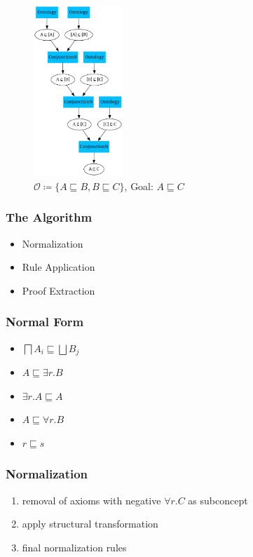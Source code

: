 \documentclass{beamer}
\begin{document}
\begin{frame}
    \frametitle{}
    \begin{figure}
        
        \centering
        \includegraphics[width=0.30\textwidth]{pictures/longerProofExample2_normalized.png}
        \caption{$\mathcal{O} \coloneq \{A \sqsubseteq B , B \sqsubseteq C \}$, Goal: $A \sqsubseteq C$}
    
    \end{figure}
     
 \end{frame}

\begin{frame}
\frametitle{The Algorithm}
\begin{itemize}
    \item Normalization
    \item Rule Application
    \item Proof Extraction
\end{itemize}
\end{frame}

\begin{frame}
\frametitle{Normal Form}
\begin{itemize}
    \item $ \bigsqcap A_i \sqsubseteq \bigsqcup B_j$
    \item $A \sqsubseteq \exists r.B$
    \item $\exists r.A \sqsubseteq A$
    \item $A \sqsubseteq \forall r.B$
    \item $r \sqsubseteq s$
\end{itemize}
  
\end{frame}

\begin{frame}
\frametitle{Normalization}
\begin{enumerate}
    \item removal of axioms with negative $\forall r.C$ as subconcept
    \item apply structural transformation
    \item final normalization rules
\end{enumerate}
\end{frame}
\end{document}
